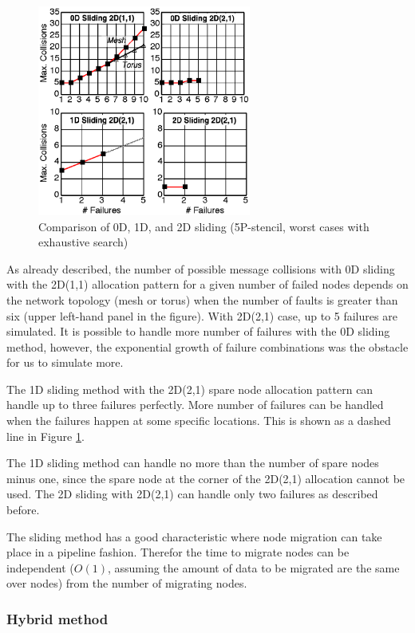 \documentclass[Afour,times,sageh]{sagej}
\begin{document}
\begin{figure}[ht]
\centering
\includegraphics[width=70mm]{Figs/SmallN-Failures.eps}
  \caption{Comparison of 0D, 1D, and 2D sliding (5P-stencil, worst
    cases with exhaustive search)}
  \label{fig:comparison}
\end{figure}

As already described, the number of
possible message collisions with 0D sliding with the 2D(1,1)
allocation pattern for a given number of failed nodes depends on the
network topology (mesh or torus) when the number of faults is greater
than six (upper left-hand panel in the figure). With 2D(2,1) case, up
to 5 failures are simulated. It is possible to handle more number of
failures with the 0D sliding method, however, the exponential growth
of failure combinations was the obstacle for us to simulate more.

The 1D sliding method with the 2D(2,1) spare node allocation pattern
can handle up to three failures perfectly. More number of failures can
be handled when the failures happen at some specific locations. This
is shown as a dashed line in Figure \ref{fig:comparison}.

The 1D sliding method can handle no more than the number of
spare nodes minus one, since the spare node at the corner of the
2D(2,1) allocation cannot be used. The 2D sliding with 2D(2,1) can
handle only two failures as described before.

The sliding method has a good characteristic where node migration can
take place in a pipeline fashion. Therefor the time to migrate nodes
can be independent ($O(1)$, assuming the amount of data to be migrated
are the same over nodes) from the number of migrating nodes.

\subsubsection*{Hybrid method}
\end{document}
